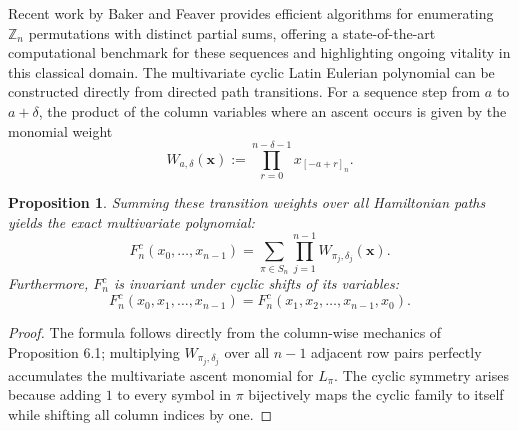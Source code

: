 \documentclass[11pt,a4paper]{amsart}
\newtheorem{proposition}[theorem]{Proposition}
\newtheorem{remark}[theorem]{Remark}
\newcommand{\1}{\mathbf{1}}
\begin{document}
Recent work by Baker and Feaver \cite{BakerFeaver2026} provides efficient algorithms for enumerating $\mathbb{Z}_n$ permutations with distinct partial sums, offering a state-of-the-art computational benchmark for these sequences and highlighting ongoing vitality in this classical domain.
The multivariate cyclic Latin Eulerian polynomial can be constructed directly from directed path transitions. For a sequence step from $a$ to $a+\delta$, the product of the column variables where an ascent occurs is given by the monomial weight
\begin{equation*}
    W_{a,\delta}(\bm{x}) := \prod_{r=0}^{n-\delta-1} x_{[-a+r]_n}.
\end{equation*}

\begin{proposition}
Summing these transition weights over all Hamiltonian paths yields the exact multivariate polynomial:
\begin{equation}
    F_n^c(x_0, \dots, x_{n-1}) = \sum_{\pi \in S_n} \prod_{j=1}^{n-1} W_{\pi_j, \delta_j}(\bm{x}).
\end{equation}
Furthermore, $F_n^c$ is invariant under cyclic shifts of its variables:
\begin{equation*}
    F_n^c(x_0, x_1, \dots, x_{n-1}) = F_n^c(x_1, x_2, \dots, x_{n-1}, x_0).
\end{equation*}
\end{proposition}

\begin{proof}
The formula follows directly from the column-wise mechanics of Proposition 6.1; multiplying $W_{\pi_j, \delta_j}$ over all $n-1$ adjacent row pairs perfectly accumulates the multivariate ascent monomial for $L_\pi$. The cyclic symmetry arises because adding $1$ to every symbol in $\pi$ bijectively maps the cyclic family to itself while shifting all column indices by one.
\end{proof}
\end{document}
